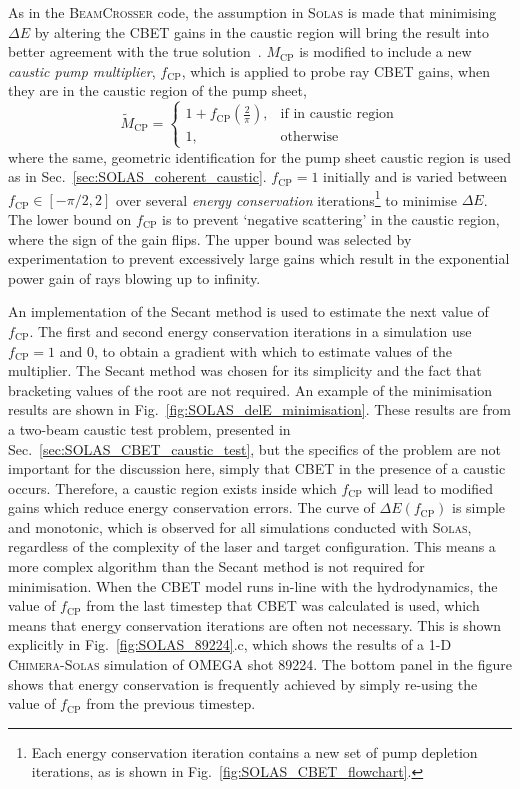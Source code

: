 As in the \textsc{BeamCrosser} code, the assumption in \textsc{Solas} is made that minimising $\Delta E$ by altering the \ac{CBET} gains in the caustic region will bring the result into better agreement with the true solution~\cite{follett_validation_2022}.
$M_{\text{CP}}$ is modified to include a new \textit{caustic pump multiplier}, $f_{\text{CP}}$, which is applied to probe ray \ac{CBET} gains, when they are in the caustic region of the pump sheet,
\begin{equation}
    \label{eq:modified_MCP}
    \tilde{M}_{\text{CP}}= 
\begin{cases}
    1 + f_{\text{CP}} \left( \frac{2}{\pi} \right),& \text{if in caustic region}\\
    1,              & \text{otherwise}
\end{cases}
\end{equation}
where the same, geometric identification for the pump sheet caustic region is used as in Sec.~\ref{sec:SOLAS_coherent_caustic}.
$f_{\text{CP}}=1$ initially and is varied between $f_{\text{CP}}\in [-\pi/2,2]$ over several \textit{energy conservation} iterations\footnote{Each energy conservation iteration contains a new set of pump depletion iterations, as is shown in Fig.~\ref{fig:SOLAS_CBET_flowchart}.} to minimise $\Delta E$.
The lower bound on $f_{\text{CP}}$ is to prevent `negative scattering' in the caustic region, where the sign of the gain flips.
The upper bound was selected by experimentation to prevent excessively large gains which result in the exponential power gain of rays blowing up to infinity.

An implementation of the Secant method is used to estimate the next value of $f_{\text{CP}}$.
The first and second energy conservation iterations in a simulation use $f_{\text{CP}}=1$ and $0$, to obtain a gradient with which to estimate values of the multiplier.
The Secant method was chosen for its simplicity and the fact that bracketing values of the root are not required.
An example of the minimisation results are shown in Fig.~\ref{fig:SOLAS_delE_minimisation}.
These results are from a two-beam caustic test problem, presented in Sec.~\ref{sec:SOLAS_CBET_caustic_test}, but the specifics of the problem are not important for the discussion here, simply that \ac{CBET} in the presence of a caustic occurs.
Therefore, a caustic region exists inside which $f_{\text{CP}}$ will lead to modified gains which reduce energy conservation errors.
The curve of $\Delta E(f_{\text{CP}})$ is simple and monotonic, which is observed for all simulations conducted with \textsc{Solas}, regardless of the complexity of the laser and target configuration.
This means a more complex algorithm than the Secant method is not required for minimisation.
When the \ac{CBET} model runs in-line with the hydrodynamics, the value of $f_{\text{CP}}$ from the last timestep that \ac{CBET} was calculated is used, which means that energy conservation iterations are often not necessary.
This is shown explicitly in Fig.~\ref{fig:SOLAS_89224}.c, which shows the results of a 1-D \textsc{Chimera}-\textsc{Solas} simulation of OMEGA shot 89224.
The bottom panel in the figure shows that energy conservation is frequently achieved by simply re-using the value of $f_{\text{CP}}$ from the previous timestep.

